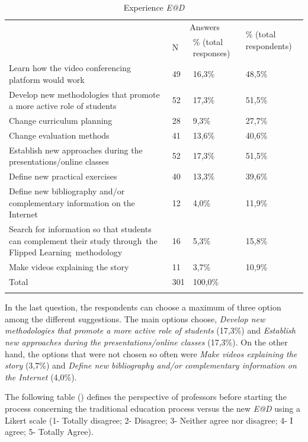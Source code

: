 \documentclass[english]{textolivre}
\begin{document}
\begin{table}[htpb]
\caption{Experience \emph{E@D}}
\label{tab3}
\small
\centering
\begin{tabular}{p{}p{}p{}p{}}
\toprule
& \multicolumn{2}{c}{Answers} & \multirow{2}{*}{\% (total respondents)}
\\
\cmidrule{2-3}
& N & \% (total responses) & 
\\
\midrule
\arrayrulecolor[gray]{.7}
Learn how the video conferencing platform would work & 49 & 16,3\% & 48,5\%
\\
Develop new methodologies that promote a more active role of students & 52 & 17,3\% & 51,5\%
\\
Change curriculum planning & 28 & 9,3\% & 27,7\%
\\
Change evaluation methods & 41 & 13,6\% & 40,6\%
\\
Establish new approaches during the presentations/online classes & 52 & 17,3\% & 51,5\%
\\
Define new practical exercises & 40 & 13,3\% & 39,6\%
\\
Define new bibliography and/or complementary information on the Internet & 12 & 4,0\% & 11,9\%
\\
Search for information so that students can complement their study through the Flipped Learning methodology & 16 & 5,3\% & 15,8\%
\\
Make videos explaining the story & 11 & 3,7\% & 10,9\%
\\
Total & 301 & 100,0\% & 
\\
\arrayrulecolor{black}
\bottomrule
\end{tabular}
\centering
{}
\end{table}

In the last question, the respondents can choose a maximum of three option among the different suggestions. The main options choose, \emph{Develop new methodologies that promote a more active role of students} (17,3\%) and \emph{Establish new approaches during the presentations/online classes} (17,3\%). On the other hand, the options that were not chosen so often were \emph{Make videos explaining the story} (3,7\%) and \emph{Define new bibliography and/or complementary information on the Internet} (4,0\%).

The following table () defines the perspective of professors before starting the process concerning the traditional education process versus the new \emph{E@D} using a Likert scale (1- Totally disagree; 2- Disagree; 3- Neither agree nor disagree; 4- I agree; 5- Totally Agree).
\end{document}
